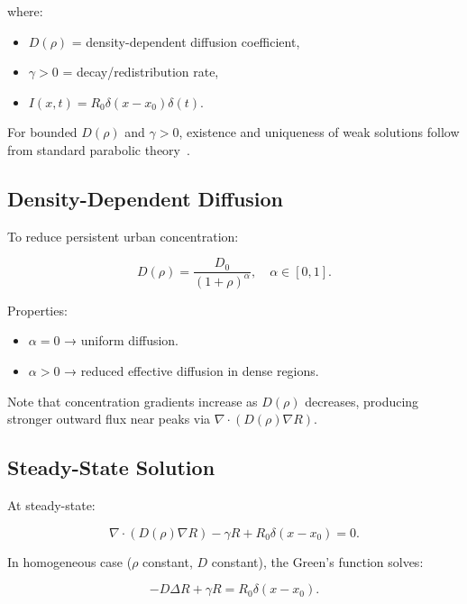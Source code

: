 \documentclass[12pt,a4paper]{article}
\theoremstyle{definition}
\begin{document}
where:

\begin{itemize}
  \item $D(\rho)$ = density-dependent diffusion coefficient,
  \item $\gamma > 0$ = decay/redistribution rate,
  \item $I(x,t) = R_0 \delta(x-x_0)\delta(t)$.
\end{itemize}

For bounded $D(\rho)$ and $\gamma > 0$,
existence and uniqueness of weak solutions follow from
standard parabolic theory~\citep{evans2010}.

\subsection{Density-Dependent Diffusion}

To reduce persistent urban concentration:

\begin{equation}
  D(\rho) = \frac{D_0}{(1+\rho)^\alpha},
  \quad \alpha \in [0,1].
\end{equation}

Properties:

\begin{itemize}
  \item $\alpha = 0$ → uniform diffusion.
  \item $\alpha > 0$ → reduced effective diffusion in dense regions.
\end{itemize}

Note that concentration gradients increase as $D(\rho)$ decreases,
producing stronger outward flux near peaks
via $\nabla \cdot (D(\rho)\nabla R)$.

\subsection{Steady-State Solution}

At steady-state:

\begin{equation}
  \nabla \cdot ( D(\rho) \nabla R )
  - \gamma R
  + R_0 \delta(x-x_0) = 0.
\end{equation}

In homogeneous case ($\rho$ constant, $D$ constant),
the Green's function solves:

\begin{equation}
  -D \Delta R + \gamma R
  =
  R_0 \delta(x-x_0).
\end{equation}
\end{document}
